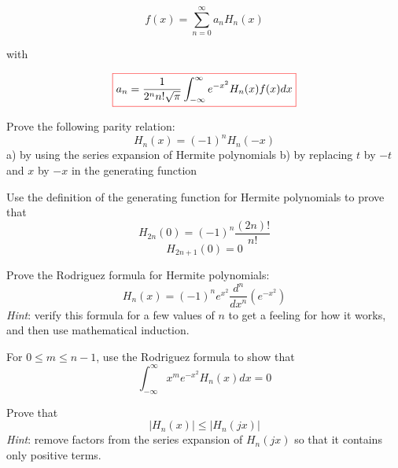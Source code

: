 \begin{equation}
f(x) = \sum_{n=0}^{\infty}a_n H_n(x)
\end{equation} 

with

\begin{equation}
\fbox{$\displaystyle
a_n = \frac{1}{2^n n!\sqrt{\pi}} \int_{-\infty}^{\infty} e^{-x^2} H_n(x) f(x) dx
$}
\end{equation} 


\begin{sidebar}
\begin{ex}
Prove the following parity relation:
$$H_n(x) = (-1)^nH_n(-x)$$
a) by using the series expansion of Hermite polynomials
b) by replacing $t$ by $-t$ and $x$ by $-x$ in the generating function
\end{ex}
\end{sidebar}

\begin{sidebar}
\begin{ex}
Use the definition of the generating function for Hermite polynomials to prove that
$$H_{2n}(0) = (-1)^n \frac{(2n)!}{n!}$$
$$H_{2n+1}(0) = 0$$
\end{ex}
\end{sidebar}

\begin{sidebar}
\begin{ex}
Prove the Rodriguez formula for Hermite polynomials:
$$H_n(x) = (-1)^n e^{x^2}\frac{d^n}{d x^n}\left(e^{-x^2}\right)$$
\emph{Hint}: verify this formula for a few values of $n$ to get a feeling for how it works, and then use mathematical induction.
\end{ex}
\end{sidebar}

\begin{sidebar}
\begin{ex}
For $0 \leq m \leq n-1$, use the Rodriguez formula to show that 
$$\int_{-\infty}^{\infty}x^m e^{-x^2} H_n(x) dx = 0$$
\end{ex}
\end{sidebar}

\begin{sidebar}
\begin{ex}
Prove that 
$$ | H_n(x) | \le  | H_n(jx) | $$
\emph{Hint}: remove factors from the series expansion of $ H_n(jx) $ so that it contains only positive terms.
\end{ex}
\end{sidebar}


